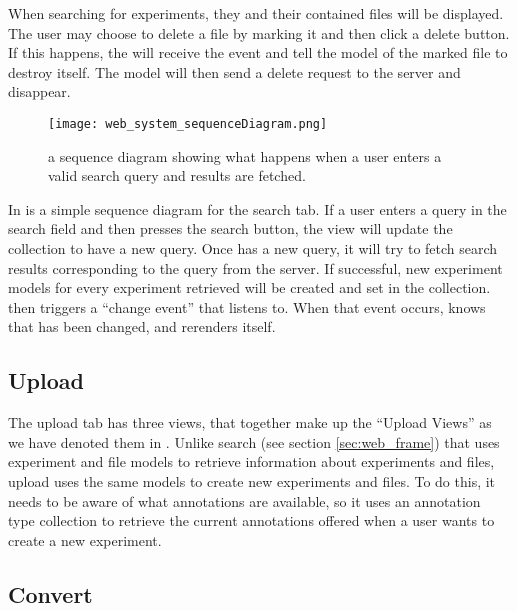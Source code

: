 \begin{example}
When searching for experiments, they and their contained files will be displayed. The user may choose to delete a file by marking it and then click a delete button. If this happens, the  will receive the event and tell the model of the marked file to destroy itself. The model will then send a delete request to the server and disappear.
\end{example}

 
\begin{figure}[h]
\centering
\texttt{[image: web\_system\_sequenceDiagram.png]}
\caption{\label{fig:web_system_sequenceDiagram}a sequence diagram showing what happens when a user enters a valid search query and results are fetched.}
\end{figure}

In  is a simple sequence diagram for the search tab. If a user enters a query in the search field and then presses the search button, the  view will update the  collection to have a new query. Once  has a new query, it will try to fetch search results corresponding to the query from the server. If successful, new experiment models for every experiment retrieved will be created and set in the  collection.  then triggers a “change event” that  listens to. When that event occurs,  knows that  has been changed, and rerenders itself.

\subsection{Upload}
The upload tab has three views, that together make up the “Upload Views” as we have denoted them in . Unlike search (see section \ref{sec:web_frame}) that uses experiment and file models to retrieve information about experiments and files, upload uses the same models to create new experiments and files. To do this, it needs to be aware of what annotations are available, so it uses an annotation type collection to retrieve the current annotations offered when a user wants to create a new experiment.

\subsection{Convert}

